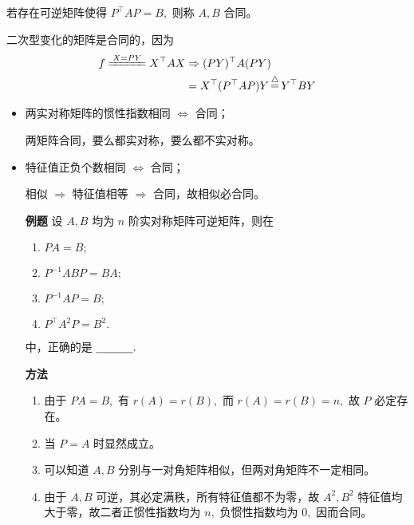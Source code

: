 

若存在可逆矩阵使得 $ P^\top AP = B, $ 则称 $ A,B $ 合同。

二次型变化的矩阵是合同的，因为
\begin{equation*}
    \begin{aligned}
        f\xlongequal{X = PY}X^\top AX &\Rightarrow (PY)^\top A(PY)
        \\ &= X^\top(P^\top AP)Y \whichis Y^\top BY
    \end{aligned}
\end{equation*} 


\begin{itemize}
    \item 两实对称矩阵的惯性指数相同 $ \Leftrightarrow $ 合同；
    
    两矩阵合同，要么都实对称，要么都不实对称。
    \item 特征值正负个数相同 $ \Leftrightarrow $ 合同；
    
    相似 $ \Rightarrow $ 特征值相等 $ \Rightarrow $ 合同，故相似必合同。
\end{itemize}

\begin{itemize}
    \item[\textbf{例题}] 设 $ A,B $ 均为 $ n $ 阶实对称矩阵可逆矩阵，则在
    \begin{enumerate}[label = \Alph*)]
        \item $ PA = B; $ 
        \item $ P^{-1}ABP=BA; $ 
        \item $ P^{-1}AP = B; $ 
        \item $ P^\top A^2P = B^2. $ 
    \end{enumerate}
    中，正确的是 $ \underline{~~~~~~~~~~}. $ 
    \item[\textbf{方法}] 
    \begin{enumerate}[label = \Alph*)]
        \item 由于 $ PA = B, $ 有 $ r(A) = r(B), $ 而 $ r(A) = r(B) = n, $ 故
        $ P $ 必定存在。
        \item 当 $ P = A $ 时显然成立。
        \item 可以知道 $ A,B $ 分别与一对角矩阵相似，但两对角矩阵不一定相同。
        \item 由于 $ A,B $ 可逆，其必定满秩，所有特征值都不为零，故
        $ A^2,B^2 $ 特征值均大于零，故二者正惯性指数均为 $ n, $ 负惯性指数均为 $ 0,
         $ 因而合同。
    \end{enumerate}
\end{itemize}

